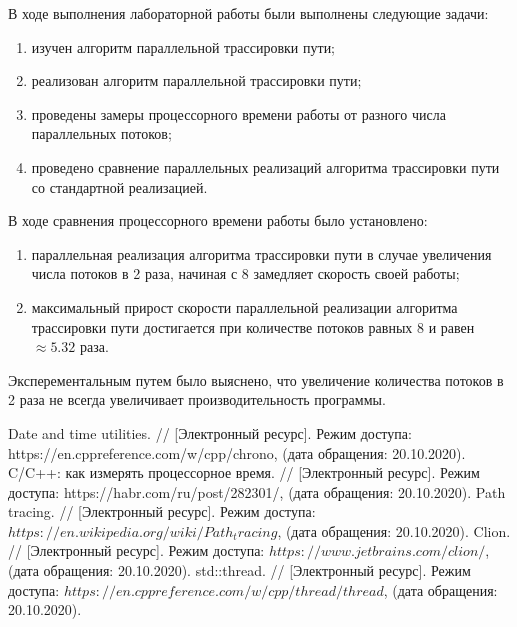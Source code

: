 \documentclass[utf8x, 12pt]{G7-32}
\begin{document}
\Conclusion
    В ходе выполнения лабораторной работы были выполнены следующие задачи:
    \begin{enumerate}
        \item изучен алгоритм параллельной трассировки пути;
        \item реализован алгоритм параллельной трассировки пути;
        \item проведены замеры процессорного времени работы от разного числа параллельных потоков;
        \item проведено сравнение параллельных реализаций алгоритма трассировки пути со стандартной реализацией.
    \end{enumerate}

В ходе сравнения процессорного времени работы было установлено:
	\begin{enumerate}
	\item параллельная реализация алгоритма трассировки пути в случае увеличения числа потоков в 2 раза, начиная с 8 замедляет скорость своей работы;
	\item максимальный прирост скорости параллельной реализации алгоритма трассировки пути достигается при количестве потоков равных 8 и равен  $ \approx 5.32 $ раза.

        \end{enumerate}


Эксперементальным путем было выяснено, что увеличение количества потоков в 2 раза не всегда увеличивает производительность программы.

    
 
\begin{thebibliography}{}
      Date and time utilities. // [Электронный ресурс]. Режим доступа: https://en.cppreference.com/w/cpp/chrono, (дата обращения: 20.10.2020).
      C/C++: как измерять процессорное время. // [Электронный ресурс]. Режим доступа: https://habr.com/ru/post/282301/, (дата обращения: 20.10.2020).
      Path tracing. // [Электронный ресурс]. Режим доступа: $https://en.wikipedia.org/wiki/Path_tracing$, (дата обращения: 20.10.2020).
      Clion. // [Электронный ресурс]. Режим доступа: $https://www.jetbrains.com/clion/$, (дата обращения: 20.10.2020).
      std::thread. // [Электронный ресурс]. Режим доступа: $https://en.cppreference.com/w/cpp/thread/thread$, (дата обращения: 20.10.2020).
\end{thebibliography}
\end{document}
